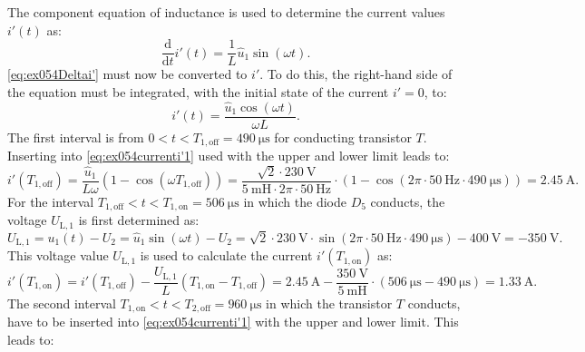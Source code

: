 
\begin{solutionblock}
    The component equation of inductance is used to determine the current values $i'(t)$ as:
    \begin{equation}
        \frac{\mathrm{d}}{\mathrm{d}t}i'(t) = \frac{1}{L}\hat u_\mathrm{1} \sin(\omega t).\label{eq:ex054Deltai'}
    \end{equation}
    \eqref{eq:ex054Deltai'} must now be converted to $i'$. To do this, the right-hand side of the equation must be integrated, with the initial state of the current $i'= 0$, to:
    \begin{equation}
        i'(t)=\frac{\hat u_\mathrm{1} \cos(\omega t)}{\omega L}.\label{eq:ex054currenti'1}
    \end{equation}
    The first interval is from $0 < t < T_\mathrm{1,off} = \SI{490}{\micro\s}$ for conducting transistor $T$. Inserting into \eqref{eq:ex054currenti'1} used with the upper and lower limit leads to:
    \begin{equation}
        i'(T_\mathrm{1,off}) = \frac{\hat u_\mathrm{1}}{L \omega}(1- \cos(\omega T_\mathrm{1,off})) = \frac{\sqrt{2}\cdot\SI{230}{\volt}}{\SI{5}{\milli\henry}\cdot 2\pi \cdot \SI{50}{\hertz}}\cdot (1-\cos(2\pi \cdot \SI{50}{\hertz} \cdot \SI{490}{\micro\s})) = \SI{2.45}{\ampere}.
    \end{equation}
    For the interval $T_\mathrm{1,off} < t < T_\mathrm{1,on} = \SI{506}{\micro\s}$ in which the diode $D_\mathrm{5}$ conducts, the voltage $U_\mathrm{L,1}$ is first determined as:
    \begin{equation}
        U_\mathrm{L,1} = u_\mathrm{1}(t) - U_\mathrm{2}= \hat u_\mathrm{1} \sin(\omega t) - U_\mathrm{2} = \sqrt{2} \cdot \SI{230}{\volt} \cdot \sin(2\pi \cdot \SI{50}{\hertz}\cdot \SI{490}{\micro\s}) - \SI{400}{\volt} = -\SI{350}{\volt}.
    \end{equation}
    This voltage value  $U_\mathrm{L,1}$ is used to calculate the current  $i'(T_\mathrm{1,on})$ as:
    \begin{equation}
        i'(T_\mathrm{1,on}) = i'(T_\mathrm{1,off}) -\frac{ U_\mathrm{L,1}}{L}(T_\mathrm{1,on}-T_\mathrm{1,off}) = \SI{2.45}{\ampere} -\frac{\SI{350}{\volt}}{\SI{5}{\milli\henry}}\cdot (\SI{506}{\micro\s}-\SI{490}{\micro\s}) = \SI{1.33}{\ampere}.
    \end{equation}
     The second interval  $T_\mathrm{1,on} < t < T_\mathrm{2,off}  = \SI{960}{\micro\s}$ in which the transistor $T$ conducts, have to be inserted  into \eqref{eq:ex054currenti'1} with the upper and lower limit. This leads to:

\end{solutionblock}
